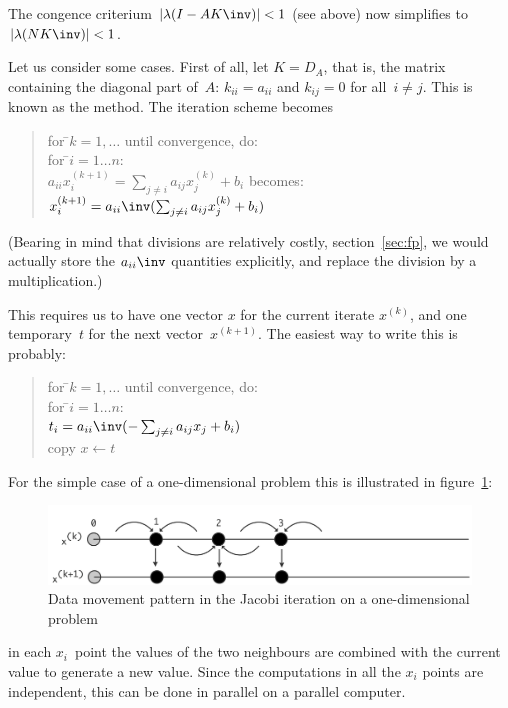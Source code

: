 The congence criterium $|\lambda(I-AK\inv)|<1$ (see
above) now simplifies to
$|\lambda(NK\inv)|<\nobreak1$.

Let us consider some cases. First of all, let $K=D_A$, that
is, the matrix containing the diagonal part of~$A$: $k_{ii}=a_{ii}$
and $k_{ij}=0$ for all~\mbox{$i\not=j$}. This is known as the
 method. The iteration scheme
becomes
\begin{quote}
  \begin{tabbing}
    for \=$k=1,\ldots$ until convergence, do:\\
    \>for \=$i=1\ldots n$:\\
    \>\>{\tt //} $a_{ii}x^{(k+1)}_i = \sum_{j\not=i}
    a_{ij}x^{(k)}_j+b_i$ becomes:\\
    \>\>$x^{(k+1)}_i = a_{ii}\inv(\sum_{j\not=i} a_{ij}x^{(k)}_j+b_i)$
  \end{tabbing}
\end{quote}
(Bearing in mind that divisions are relatively costly,
section~\ref{sec:fp}, we would actually store the $a_{ii}\inv$
quantities explicitly, and replace the division by a multiplication.)

This requires us to have one vector $x$ for the current iterate
$x^{(k)}$, and one temporary~$t$ for the next vector~$x^{(k+1)}$. The
easiest way to write this is probably:
\begin{quote}
  \begin{tabbing}
    for \=$k=1,\ldots$ until convergence, do:\\
    \>for \=$i=1\ldots n$:\\
    \>\>$t_i = a_{ii}\inv (-\sum_{j\not=i} a_{ij}x_j+b_i)$\\
    \>copy $x\leftarrow t$
  \end{tabbing}
\end{quote}
For the simple case of a one-dimensional problem this is illustrated
in figure~\ref{fig:1d-jacobi}:
\begin{figure}[ht]
  \includegraphics[scale=.08]{graphics-public/jacobi}
  \caption{Data movement pattern in the Jacobi iteration on a
    one-dimensional problem}
  \label{fig:1d-jacobi}
\end{figure}
in each $x_i$~point the values of the two neighbours are combined with
the current value to generate a new value. Since the computations in
all the $x_i$ points are independent, this can be done
in parallel on a parallel computer.

